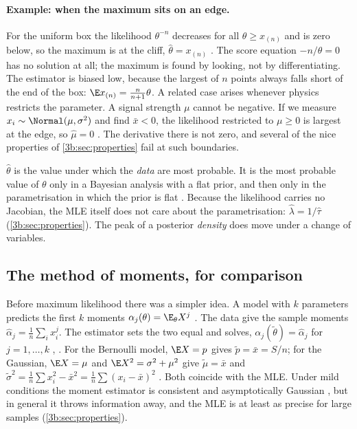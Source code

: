 \paragraph{Example: when the maximum sits on an edge.}
For the uniform box the likelihood $\theta^{-n}$ decreases for all
$\theta\ge x_{(n)}$ and is zero below, so the maximum is at the cliff,
$\hat\theta=x_{(n)}$ . The score equation
$-n/\theta=0$ has no solution at all; the maximum is found by looking, not
by differentiating. The estimator is biased low, because the largest of $n$
points always falls short of the end of the box:
$\E x_{(n)}=\tfrac{n}{n+1}\theta$. A related case arises whenever physics
restricts the parameter. A signal strength $\mu$ cannot be negative. If we
measure $x_i\sim\Normal(\mu,\sigma^2)$ and find $\bar x<0$, the likelihood
restricted to $\mu\ge0$ is largest at the edge, so $\hat\mu=0$
. The derivative there is not zero, and
several of the nice properties of \cref{3b:sec:properties} fail at such
boundaries.

\begin{pitfall}
$\hat\theta$ is the value under which the \emph{data} are most probable. It
is the most probable value of $\theta$ only in a Bayesian analysis with a
flat prior, and then only in the parametrisation in which the prior is flat
. Because the likelihood carries no Jacobian, the
MLE itself does not care about the parametrisation:
$\hat\lambda=1/\hat\tau$ (\cref{3b:sec:properties}). The peak of a posterior
\emph{density} does move under a change of variables.
\end{pitfall}

\subsection{The method of moments, for comparison}
\label{3b:sec:mom}

Before maximum likelihood there was a simpler idea. A model with $k$
parameters predicts the first $k$ moments $\alpha_j(\theta)=\E_\theta X^j$
. The data give the sample moments
$\hat\alpha_j=\tfrac1n\sum_ix_i^j$. The 
estimator sets the two equal and solves,
$\alpha_j(\tilde\theta)=\hat\alpha_j$ for $j=1,\dots,k$
, . For the Bernoulli
model, $\E X=p$ gives $\tilde p=\bar x=S/n$; for the Gaussian, $\E X=\mu$
and $\E X^2=\sigma^2+\mu^2$ give $\tilde\mu=\bar x$ and
$\tilde\sigma^2=\tfrac1n\sum x_i^2-\bar x^2=\tfrac1n\sum(x_i-\bar x)^2$
. Both coincide with the MLE. Under mild
conditions the moment estimator is consistent and asymptotically Gaussian
, but in general it throws information away, and
the MLE is at least as precise for large samples (\cref{3b:sec:properties}).

